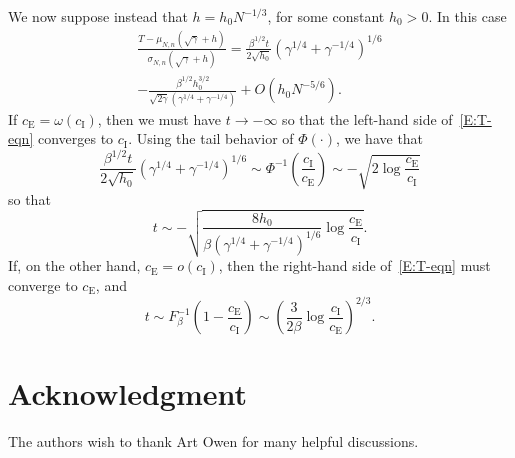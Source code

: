 \documentclass[final]{IEEEtran}
\newcommand{\ce}{c_\text{E}}
\newcommand{\ci}{c_\text{I}}
\begin{document}
\begin{IEEEproof}
We now suppose instead that $h = h_0 N^{-1/3}$, for some constant
$h_0 > 0$.  In this case
\begin{multline*}
    \frac{ T - \mu_{N,n}(\sqrt{\gamma} + h)}
         { \sigma_{N,n}(\sqrt{\gamma} + h) }
    =
    \frac{\beta^{1/2} t}{2 \sqrt{ h_0 } }
    \left( \gamma^{1/4} + \gamma^{-1/4} \right)^{1/6}
    \\
    -
    \frac{\beta^{1/2} h_0^{3/2}}
         { \sqrt{ 2 \gamma } \left( \gamma^{1/4} + \gamma^{-1/4} \right) }
    +
    O( h_0 N^{-5/6 }).
\end{multline*}
If $\ce = \omega( \ci )$, then we must have $t \to -\infty$ so that the
left-hand side of~\eqref{E:T-eqn} converges to $\ci$.  Using the tail
behavior of $\Phi( \cdot )$, we have that
\[
    \frac{\beta^{1/2} t}{2 \sqrt{h_0}}
    \left(
        \gamma^{1/4} + \gamma^{-1/4}
    \right)^{1/6}
    \sim
    \Phi^{-1} \left( \frac{\ci}{\ce} \right)
    \sim
    -
    \sqrt{
        2 \log \frac{\ce}{\ci}
    }
\]
so that
\[
    t
    \sim
    -
    \sqrt{
        \frac{ 8 h_0 }{ \beta (\gamma^{1/4} + \gamma^{-1/4} )^{1/6} }
        \log \frac{\ce}{\ci}
    }.
\]
If, on the other hand, $\ce = o(\ci)$, then the right-hand side of~\eqref{E:T-eqn}
must converge to $\ce$, and
\[
    t
    \sim
    F_\beta^{-1} \left( 1 - \frac{\ce}{\ci} \right)
    \sim
    \left(
        \frac{3}{2 \beta}
        \log \frac{\ci}{\ce}
    \right)^{2/3}.
\]
\end{IEEEproof}

\section*{Acknowledgment}
The authors wish to thank Art Owen for many helpful discussions.

%
%
\end{document}
